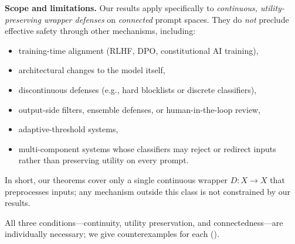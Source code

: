 \documentclass[11pt]{article}
\begin{document}
\medskip
\noindent\textbf{Scope and limitations.}
Our results apply specifically to \emph{continuous, utility-preserving
wrapper defenses} on \emph{connected} prompt spaces. They do \emph{not}
preclude effective safety through other mechanisms, including:
\begin{itemize}[nosep]
  \item training-time alignment (RLHF, DPO, constitutional AI training),
  \item architectural changes to the model itself,
  \item discontinuous defenses (e.g., hard blocklists or discrete classifiers),
  \item output-side filters, ensemble defenses, or human-in-the-loop review,
  \item adaptive-threshold systems,
  \item multi-component systems whose classifiers may reject or redirect
        inputs rather than preserving utility on every prompt.
\end{itemize}
In short, our theorems cover only a single continuous wrapper
$D\colon X \to X$ that preprocesses inputs; any mechanism outside this
class is not constrained by our results.

All three conditions---continuity, utility preservation, and
connectedness---are individually necessary; we give counterexamples
for each ().
\end{document}
